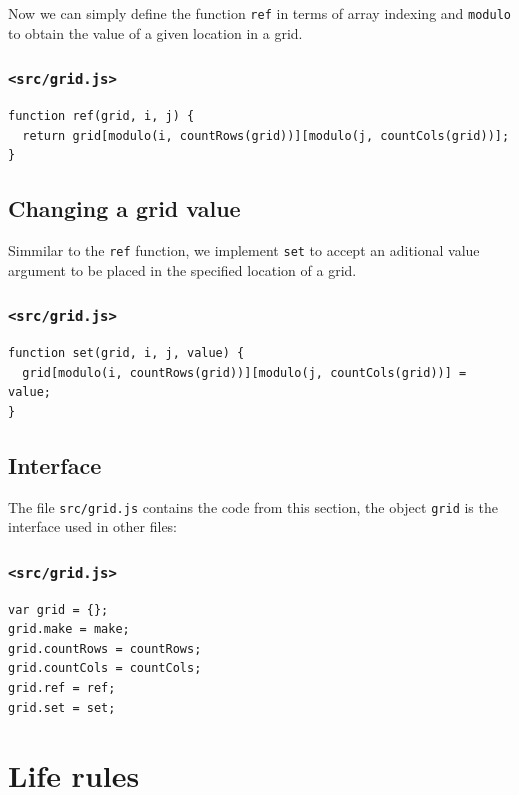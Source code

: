 \documentclass[11pt]{article}
\begin{document}
Now we can simply define the function \texttt{ref} in terms of array indexing and \texttt{modulo} to obtain the value of a given location in a grid.

\subsubsection*{\texttt{<src/grid.js>}}
\label{sec:orgf029ee3}
\begin{verbatim}
function ref(grid, i, j) {
  return grid[modulo(i, countRows(grid))][modulo(j, countCols(grid))];
}
\end{verbatim}

\subsection{Changing a grid value}
\label{sec:org0acb416}

Simmilar to the \texttt{ref} function, we implement \texttt{set} to accept an aditional value argument to be placed in the specified location of a grid.

\subsubsection*{\texttt{<src/grid.js>}}
\label{sec:orge0b7c12}
\begin{verbatim}
function set(grid, i, j, value) {
  grid[modulo(i, countRows(grid))][modulo(j, countCols(grid))] = value;
}
\end{verbatim}

\subsection{Interface}
\label{sec:org76edc08}

The file \texttt{src/grid.js} contains the code from this section, the object \texttt{grid} is the interface used in other files:

\subsubsection*{\texttt{<src/grid.js>}}
\label{sec:org727638d}
\begin{verbatim}
var grid = {};
grid.make = make;
grid.countRows = countRows;
grid.countCols = countCols;
grid.ref = ref;
grid.set = set;
\end{verbatim}

\section{Life rules}
\label{sec:org20aca7d}
\end{document}
